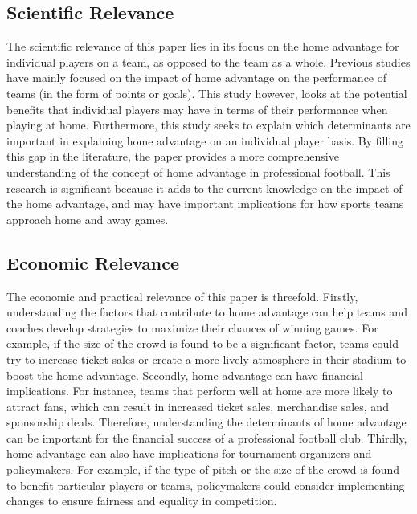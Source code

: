 \subsection{Scientific Relevance}
The scientific relevance of this paper lies in its focus on the home advantage for individual players on a team, as opposed to the team as a whole. Previous studies have mainly focused on the impact of home advantage on the performance of teams (in the form of points or goals). This study however, looks at the potential benefits that individual players may have in terms of their performance when playing at home. Furthermore, this study seeks to explain which determinants are important in explaining home advantage on an individual player basis. By filling this gap in the literature, the paper provides a more comprehensive understanding of the concept of home advantage in professional football. This research is significant because it adds to the current knowledge on the impact of the home advantage, and may have important implications for how sports teams approach home and away games.

\subsection{Economic Relevance}
The economic and practical relevance of this paper is threefold. Firstly, understanding the factors that contribute to home advantage can help teams and coaches develop strategies to maximize their chances of winning games. For example, if the size of the crowd is found to be a significant factor, teams could try to increase ticket sales or create a more lively atmosphere in their stadium to boost the home advantage. Secondly, home advantage can have financial implications. For instance, teams that perform well at home are more likely to attract fans, which can result in increased ticket sales, merchandise sales, and sponsorship deals. Therefore, understanding the determinants of home advantage can be important for the financial success of a professional football club. Thirdly, home advantage can also have implications for tournament organizers and policymakers. For example, if the type of pitch or the size of the crowd is found to benefit particular players or teams, policymakers could consider implementing changes to ensure fairness and equality in competition.